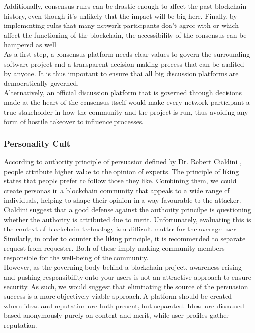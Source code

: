 \documentclass[12pt,a4paper]{article}
\begin{document}
Additionally, consensus rules can be drastic enough to affect the past blockchain history, even though it's unlikely that the impact will be big here. Finally, by implementing rules that many network participants don't agree with or which affect the functioning of the \gls{blockchain}, the accessibility of the consensus can be hampered as well.\\

As a first step, a consensus platform needs clear values to govern the surrounding software project and a transparent decision-making process that can be audited by anyone. It is thus important to ensure that all big discussion platforms are democratically governed.\\

Alternatively, an official discussion platform that is governed through decisions made at the heart of the consensus itself would make every network participant a true stakeholder in how the community and the project is run, thus avoiding any form of hostile takeover to influence processes.\\

\subsubsection{Personality Cult}

According to authority principle of persuasion defined by Dr. Robert Cialdini \cite{influence}, people attribute higher value to the opinion of experts. The principle of liking states that people prefer to follow those they like. Combining them, we could create personas in a blockchain community that appeals to a wide range of individuals, helping to shape their opinion in a way favourable to the attacker.\\

Cialdini suggest that a good defense against the authority princilpe is questioning whether the authority is attributed due to merit. Unfortunately, evaluating this is the context of blockchain technology is a difficult matter for the average user. Similarly, in order to counter the liking principle, it is recommended to separate request from requester. Both of these imply making community members responsible for the well-being of the community.\\

However, as the governing body behind a blockchain project, awareness raising and pushing responsibility onto your users is not an attractive approach to ensure security. As such, we would suggest that eliminating the source of the persuasion success is a more objectively viable approach. A platform should be created where ideas and reputation are both present, but separated. Ideas are discussed based anonymously purely on content and merit, while user profiles gather reputation.\\
\end{document}
